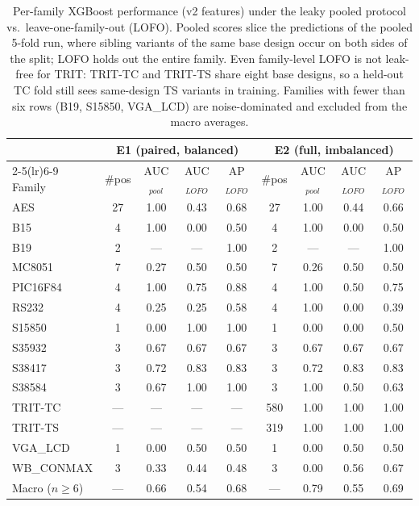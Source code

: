 \begin{table}[t]
\centering
\caption{Per-family XGBoost performance (v2 features) under the leaky pooled protocol vs.\ leave-one-family-out (LOFO). Pooled scores slice the predictions of the pooled 5-fold run, where sibling variants of the same base design occur on both sides of the split; LOFO holds out the entire family. Even family-level LOFO is not leak-free for TRIT: TRIT-TC and TRIT-TS share eight base designs, so a held-out TC fold still sees same-design TS variants in training. Families with fewer than six rows (B19, S15850, VGA\_LCD) are noise-dominated and excluded from the macro averages.}
\label{tab:family}
\small
\begin{tabular}{lcccccccc}
\toprule
& \multicolumn{4}{c}{E1 (paired, balanced)} & \multicolumn{4}{c}{E2 (full, imbalanced)} \\
\cmidrule(lr){2-5}\cmidrule(lr){6-9}
Family & \#pos & AUC$_{pool}$ & AUC$_{LOFO}$ & AP$_{LOFO}$ & \#pos & AUC$_{pool}$ & AUC$_{LOFO}$ & AP$_{LOFO}$ \\
\midrule
AES & 27 & 1.00 & 0.43 & 0.68 & 27 & 1.00 & 0.44 & 0.66 \\
B15 & 4 & 1.00 & 0.00 & 0.50 & 4 & 1.00 & 0.00 & 0.50 \\
B19 & 2 & --- & --- & 1.00 & 2 & --- & --- & 1.00 \\
MC8051 & 7 & 0.27 & 0.50 & 0.50 & 7 & 0.26 & 0.50 & 0.50 \\
PIC16F84 & 4 & 1.00 & 0.75 & 0.88 & 4 & 1.00 & 0.50 & 0.75 \\
RS232 & 4 & 0.25 & 0.25 & 0.58 & 4 & 1.00 & 0.00 & 0.39 \\
S15850 & 1 & 0.00 & 1.00 & 1.00 & 1 & 0.00 & 0.00 & 0.50 \\
S35932 & 3 & 0.67 & 0.67 & 0.67 & 3 & 0.67 & 0.67 & 0.67 \\
S38417 & 3 & 0.72 & 0.83 & 0.83 & 3 & 0.72 & 0.83 & 0.83 \\
S38584 & 3 & 0.67 & 1.00 & 1.00 & 3 & 1.00 & 0.50 & 0.63 \\
TRIT-TC & --- & --- & --- & --- & 580 & 1.00 & 1.00 & 1.00 \\
TRIT-TS & --- & --- & --- & --- & 319 & 1.00 & 1.00 & 1.00 \\
VGA\_LCD & 1 & 0.00 & 0.50 & 0.50 & 1 & 0.00 & 0.50 & 0.50 \\
WB\_CONMAX & 3 & 0.33 & 0.44 & 0.48 & 3 & 0.00 & 0.56 & 0.67 \\
\midrule
Macro ($n\geq 6$) & --- & 0.66 & 0.54 & 0.68 & --- & 0.79 & 0.55 & 0.69 \\
\bottomrule
\end{tabular}
\end{table}
